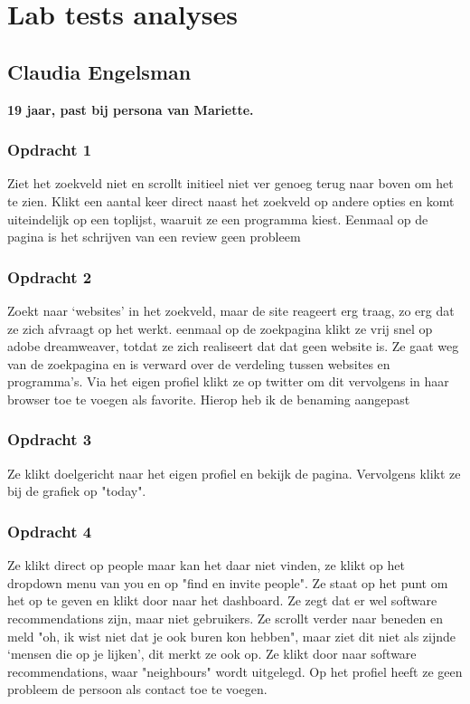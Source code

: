\chapter{Lab tests analyses}
    \label{labtestsappendix}

\section{Claudia Engelsman}
\textbf{19 jaar, past bij persona van Mariette.}

\subsection{Opdracht 1}
  Ziet het zoekveld niet en scrollt initieel niet ver genoeg terug naar boven om het te zien. Klikt een aantal keer direct naast het zoekveld op andere opties en komt uiteindelijk op een toplijst, waaruit ze een programma kiest. Eenmaal op de pagina is het schrijven van een review geen probleem

\subsection{Opdracht 2}
  Zoekt naar `websites' in het zoekveld, maar de site reageert erg traag, zo erg dat ze zich afvraagt op het werkt. eenmaal op de zoekpagina klikt ze vrij snel op adobe dreamweaver, totdat ze zich realiseert dat dat geen website is. Ze gaat weg van de zoekpagina en is verward over de verdeling tussen websites en programma's. Via het eigen profiel klikt ze op twitter om dit vervolgens in haar browser toe te voegen als favorite. Hierop heb ik de benaming aangepast

\subsection{Opdracht 3}
  Ze klikt doelgericht naar het eigen profiel en bekijk de pagina. Vervolgens klikt ze bij de grafiek op "today".

\subsection{Opdracht 4}
 Ze klikt direct op people maar kan het daar niet vinden, ze klikt op het dropdown menu van you en op "find en invite people". Ze staat op het punt om het op te geven en klikt door naar het dashboard. Ze zegt dat er wel software recommendations zijn, maar niet gebruikers. Ze scrollt verder naar beneden en meld "oh, ik wist niet dat je ook buren kon hebben", maar ziet dit niet als zijnde `mensen die op je lijken', dit merkt ze ook op. Ze klikt door naar software recommendations, waar "neighbours" wordt uitgelegd. Op het profiel heeft ze geen probleem de persoon als contact toe te voegen.


